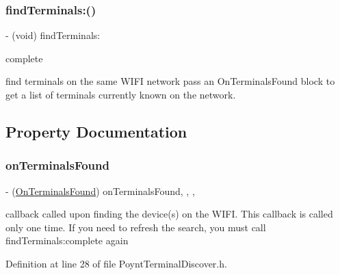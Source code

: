 \subsubsection{\texorpdfstring{find\+Terminals\+:()}{findTerminals:()}}
{\footnotesize\ttfamily -\/ (void) find\+Terminals\+: \begin{DoxyParamCaption}\item[{(\hyperlink{_poynt_terminal_discover_8h_a45c48a836064cd340f281fa5ef2edef5}{On\+Terminals\+Found})}]{complete }\end{DoxyParamCaption}}



find terminals on the same W\+I\+FI network  pass an On\+Terminals\+Found block to get a list of terminals currently known on the network. 



\subsection{Property Documentation}
\hypertarget{interface_poynt_terminal_discover_a2108a121006de9953dbf24fa265db472}{}\label{interface_poynt_terminal_discover_a2108a121006de9953dbf24fa265db472} 
\subsubsection{\texorpdfstring{on\+Terminals\+Found}{onTerminalsFound}}
{\footnotesize\ttfamily -\/ (\hyperlink{_poynt_terminal_discover_8h_a45c48a836064cd340f281fa5ef2edef5}{On\+Terminals\+Found}) on\+Terminals\+Found\hspace{0.3cm}{\ttfamily [read]}, {\ttfamily [write]}, {\ttfamily [nonatomic]}, {\ttfamily [copy]}}



callback called upon finding the device(s) on the W\+I\+FI.  This callback is called only one time. If you need to refresh the search, you must call find\+Terminals\+:complete again 



Definition at line 28 of file Poynt\+Terminal\+Discover.\+h.

\hypertarget{interface_poynt_terminal_discover_a3ec4dc196847dee68ad6c99d08bfef95}{}\label{interface_poynt_terminal_discover_a3ec4dc196847dee68ad6c99d08bfef95} 
